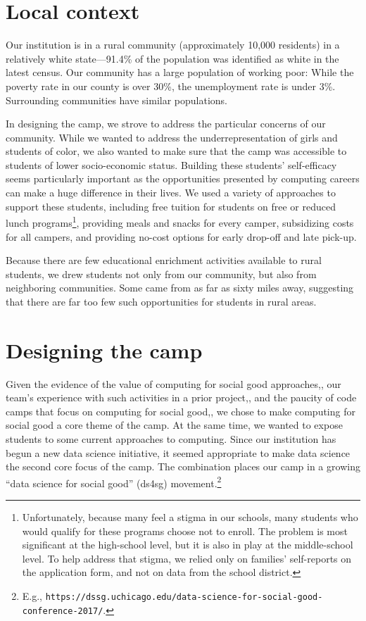 \section{Local context}

Our institution is in a rural community (approximately 10,000
residents) in a relatively white state---91.4\% of the population was
identified as white in the latest census.  Our community has a large
population of working poor: While the poverty rate in our county
is over 30\%, the unemployment rate is under 3\%.  Surrounding
communities have similar populations.

In designing the camp, we strove to address the particular concerns
of our community.  While we wanted to address the underrepresentation
of girls and students of color, we also wanted to make sure that
the camp was accessible to students of lower socio-economic status.
Building these students' self-efficacy seems particularly important
as the opportunities presented by computing careers can make a huge
difference in their lives.  We used a variety of approaches to
support these students, including free tuition for students on free
or reduced lunch programs\footnote{Unfortunately, because many feel
a stigma in our schools, many students who would qualify for these
programs choose not to enroll.  The problem is most significant at
the high-school level, but it is also in play at the
middle-school level.  To help address that stigma, we relied only
on families' self-reports on the application form, and not on data
from the school district.}, providing meals and snacks for every
camper, subsidizing costs for all campers, and providing no-cost
options for early drop-off and late pick-up.

Because there are few educational enrichment activities available
to rural students, we drew students not only from our community,
but also from neighboring communities.  Some came from as far as
sixty miles away, suggesting that there are far too few such
opportunities for students in rural areas.

\section{Designing the camp}

Given the evidence of the value of computing for social good
approaches,\cite{Goldweber2013,Goldweber2018}, our team's experience
with such activities in a prior project,\cite{arts-coding}, and the
paucity of code camps that focus on computing for social
good,\cite{code-camp-survey-sigcse-2017}, we chose to make
computing for social good a core theme of the camp.  At the same
time, we wanted to expose students to some current approaches to
computing.  Since our institution has begun a new data science
initiative, it seemed appropriate to make data science the second
core focus of the camp.  The combination places our camp in a growing
``data science for social good'' (ds4sg) movement.\footnote{E.g.,
\texttt{https://dssg.uchicago.edu/data-science-for-social-good-conference-2017/}.}

